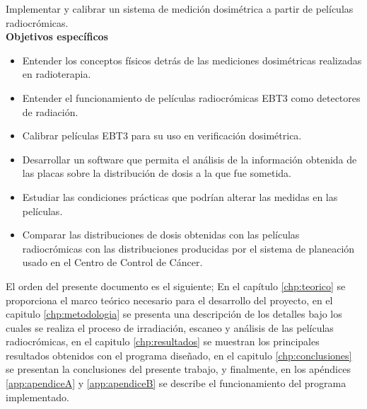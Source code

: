 Implementar y calibrar un sistema de medición dosimétrica a partir de películas radiocrómicas.\\

\textbf{Objetivos específicos}\\


\begin{itemize}
	\item Entender los conceptos físicos detrás de las mediciones dosimétricas realizadas en radioterapia.
	\item Entender el funcionamiento de películas radiocrómicas EBT3 como detectores de radiación.
	\item Calibrar películas EBT3 para su uso en verificación dosimétrica.
	\item Desarrollar un software que permita el análisis de la información obtenida de las placas sobre la distribución de dosis a la que fue sometida.
	\item Estudiar las condiciones prácticas que podrían alterar las medidas en las películas. 
	\item Comparar  las  distribuciones  de  dosis  obtenidas  con  las  películas  radiocrómicas con las distribuciones producidas por el sistema de planeación usado en el Centro de Control de Cáncer.
\end{itemize}

El orden del presente documento es el siguiente; En el capítulo \ref{chp:teorico} se proporciona el marco teórico necesario para el desarrollo del proyecto, en el capitulo \ref{chp:metodologia} se presenta una descripción de los detalles bajo los cuales se realiza el proceso de irradiación, escaneo y análisis de las películas radiocrómicas, en el capitulo \ref{chp:resultados} se muestran los principales resultados obtenidos con el programa diseñado, en el capitulo \ref{chp:conclusiones} se presentan la conclusiones del presente trabajo, y finalmente, en los apéndices \ref{app:apendiceA} y \ref{app:apendiceB} se describe el funcionamiento del programa implementado.